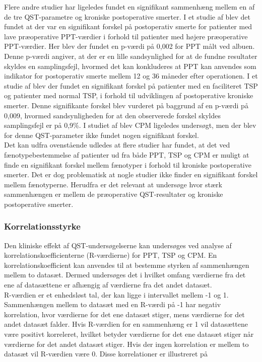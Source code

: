 Flere andre studier har ligeledes fundet en signifikant sammenhæng mellem en af de tre QST-parametre og kroniske postoperative smerter. \citep{Wylde2013} \citep{Wright2015} I et studie af  blev det fundet at der var en signifikant forskel på postoperativ smerte for patienter med lave præoperative PPT-værdier i forhold til patienter med højere præoperative PPT-værdier. Her blev der fundet en p-værdi på 0,002 for PPT målt ved albuen. Denne p-værdi angiver, at der er en lille sandsynlighed for at de fundne resultater skyldes en samplingsfejl, hvormed det kan konkluderes at PPT kan anvendes som indikator for postoperativ smerte mellem 12 og 36 måneder efter operationen. \citep{Wright2015} I et studie af  blev der fundet en signifikant forskel på patienter med en faciliteret TSP og patienter med normal TSP, i forhold til udviklingen af postoperative kroniske smerter. Denne signifikante forskel blev vurderet på baggrund af en p-værdi på 0,009, hvormed sandsynligheden for at den observerede forskel skyldes samplingsfejl er på 0,9\%. I studiet af  blev CPM ligeledes undersøgt, men der blev for denne QST-parameter ikke fundet nogen signifikant forskel. \\
Det kan udfra ovenstående udledes at flere studier har fundet, at det ved fænotypebestemmelse af patienter ud fra både PPT, TSP og CPM er muligt at finde en signifikant forskel mellem fænotyper i forhold til kroniske postoperative smerter. Det er dog problematisk at nogle studier ikke finder en signifikant forskel mellem fænotyperne. \citep{Leary2016} Herudfra er det relevant at undersøge hvor stærk sammenhængen er mellem de præoperative QST-resultater og kroniske postoperative smerter.   

\subsubsection{Korrelationsstyrke}
Den kliniske effekt af QST-undersøgelserne kan undersøges ved analyse af korrelationskoefficienterne (R-værdierne) for PPT, TSP og CPM. En korrelationskoefficient kan anvendes til at bestemme styrken af sammenhængen mellem to datasæt. Dermed undersøges det i hvilket omfang værdierne fra det ene af datasættene er afhængig af værdierne fra det andet datasæt. \citep{Zar2010} \\
R-værdien er et enhedsløst tal, der kan ligge i intervallet mellem -1 og 1. Sammenhængen mellem to datasæt med en R-værdi på -1 har negativ korrelation, hvor værdierne for det ene datasæt stiger, mens værdierne for det andet datasæt falder. Hvis R-værdien for en sammenhæng er 1 vil datasættene være positivt korreleret, hvilket betyder værdierne for det ene datasæt stiger når værdierne for det andet datasæt stiger. Hvis der ingen korrelation er mellem to datasæt vil R-værdien være 0. \citep{Zar2010} Disse korrelationer er illustreret på 

